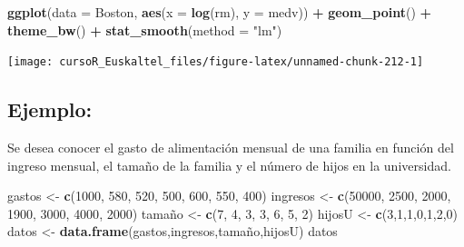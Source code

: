 \documentclass[]{book}
\newenvironment{Shaded}{\begin{snugshade}}{\end{snugshade}}
\newcommand{\KeywordTok}[1]{\textcolor[rgb]{0.13,0.29,0.53}{\textbf{#1}}}
\newcommand{\DataTypeTok}[1]{\textcolor[rgb]{0.13,0.29,0.53}{#1}}
\newcommand{\DecValTok}[1]{\textcolor[rgb]{0.00,0.00,0.81}{#1}}
\newcommand{\StringTok}[1]{\textcolor[rgb]{0.31,0.60,0.02}{#1}}
\newcommand{\OperatorTok}[1]{\textcolor[rgb]{0.81,0.36,0.00}{\textbf{#1}}}
\newcommand{\NormalTok}[1]{#1}
\begin{document}
\begin{Shaded}
\begin{Highlighting}[]
\KeywordTok{ggplot}\NormalTok{(}\DataTypeTok{data =}\NormalTok{ Boston, }\KeywordTok{aes}\NormalTok{(}\DataTypeTok{x =} \KeywordTok{log}\NormalTok{(rm), }\DataTypeTok{y =}\NormalTok{ medv)) }\OperatorTok{+}
\StringTok{  }\KeywordTok{geom_point}\NormalTok{() }\OperatorTok{+}
\StringTok{  }\KeywordTok{theme_bw}\NormalTok{() }\OperatorTok{+}\StringTok{ }
\StringTok{  }\KeywordTok{stat_smooth}\NormalTok{(}\DataTypeTok{method =} \StringTok{"lm"}\NormalTok{)}
\end{Highlighting}
\end{Shaded}

\begin{center}\texttt{[image: cursoR\_Euskaltel\_files/figure-latex/unnamed-chunk-212-1]} \end{center}

\subsection{Ejemplo:}\label{ejemplo}

Se desea conocer el gasto de alimentación mensual de una familia en
función del ingreso mensual, el tamaño de la familia y el número de
hijos en la universidad.

\begin{Shaded}
\begin{Highlighting}[]
\NormalTok{gastos <-}\StringTok{ }\KeywordTok{c}\NormalTok{(}\DecValTok{1000}\NormalTok{, }\DecValTok{580}\NormalTok{, }\DecValTok{520}\NormalTok{, }\DecValTok{500}\NormalTok{, }\DecValTok{600}\NormalTok{, }\DecValTok{550}\NormalTok{, }\DecValTok{400}\NormalTok{)}
\NormalTok{ingresos <-}\StringTok{ }\KeywordTok{c}\NormalTok{(}\DecValTok{50000}\NormalTok{, }\DecValTok{2500}\NormalTok{, }\DecValTok{2000}\NormalTok{, }\DecValTok{1900}\NormalTok{, }\DecValTok{3000}\NormalTok{, }\DecValTok{4000}\NormalTok{, }\DecValTok{2000}\NormalTok{)}
\NormalTok{tamaño <-}\StringTok{ }\KeywordTok{c}\NormalTok{(}\DecValTok{7}\NormalTok{, }\DecValTok{4}\NormalTok{, }\DecValTok{3}\NormalTok{, }\DecValTok{3}\NormalTok{, }\DecValTok{6}\NormalTok{, }\DecValTok{5}\NormalTok{, }\DecValTok{2}\NormalTok{)}
\NormalTok{hijosU <-}\StringTok{ }\KeywordTok{c}\NormalTok{(}\DecValTok{3}\NormalTok{,}\DecValTok{1}\NormalTok{,}\DecValTok{1}\NormalTok{,}\DecValTok{0}\NormalTok{,}\DecValTok{1}\NormalTok{,}\DecValTok{2}\NormalTok{,}\DecValTok{0}\NormalTok{)}
\NormalTok{datos <-}\StringTok{ }\KeywordTok{data.frame}\NormalTok{(gastos,ingresos,tamaño,hijosU)}
\NormalTok{datos}
\end{Highlighting}
\end{Shaded}
\end{document}
